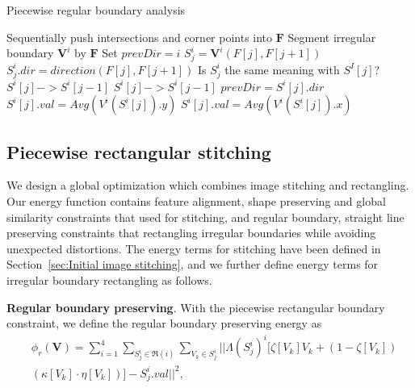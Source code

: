 \documentclass[10pt,journal,compsoc]{IEEEtran}
\newcommand{\zfl}[1]{{\color{red}#1}}
\begin{document}
\begin{algorithm}
 \label{alg:piecewise_analysis}
     \caption{Piecewise regular boundary analysis}
      Sequentially push intersections and corner points into $\mathbf{F}$\;
      Segment irregular boundary $\mathbf{V}^i$ by $\mathbf{F}$\;
      Set $prevDir=i$\;
      {
           $S^i_j=\mathbf{V}^i(F[j], F[j+1])$\;
           $S^i_j.dir=direction(F[j], F[j+1])$\;
      }
      \zfl{Is $S^i_j$ the same meaning with $S^I[j]$?}
      {
         {
              $S^i[j] -> S^i[j-1]$\;
         }
         \Else
         {
               {
                     $S^i[j] -> S^i[j-1]$\;
               }
               \Else
               {
                    $prevDir = S^i[j].dir$\;
               }
          }
           {
                $S^i[j].val = Avg(V^i(S^i[j]).y)$\;
           }
           \Else
           {
                $S^i[j].val = Avg(V^i(S^i[j]).x)$\;
           }
      }
\end{algorithm}

\subsection{Piecewise rectangular stitching}
We design a global optimization which combines image stitching and rectangling.
Our energy function contains feature alignment, shape preserving and global similarity constraints that used for stitching,
and regular boundary, straight line preserving constraints that rectangling irregular boundaries while avoiding unexpected distortions.
The energy terms for stitching have been defined in Section~\ref{sec:Initial image stitching}, and we further define energy terms for irregular boundary rectangling as follows.

\textbf{Regular boundary preserving}.
With the piecewise rectangular boundary constraint, we define the regular boundary preserving energy as
\begin{equation} \label{equ:piecewise_boundary}
\begin{split}
   &\phi_r(\mathbf{V})=\sum\limits_{i=1}^4\sum\limits_{S^i_j \in \Re(i)}\sum\limits_{V_k \in S^i_j}|| \Lambda(S^i_j)^i[\zeta[V_k] V_k+(1-\zeta[V_k])\\
   &(\kappa[V_k] \cdot \eta[V_k])]-S^i_j.val ||^2,
\end{split}
\end{equation}
\end{document}
